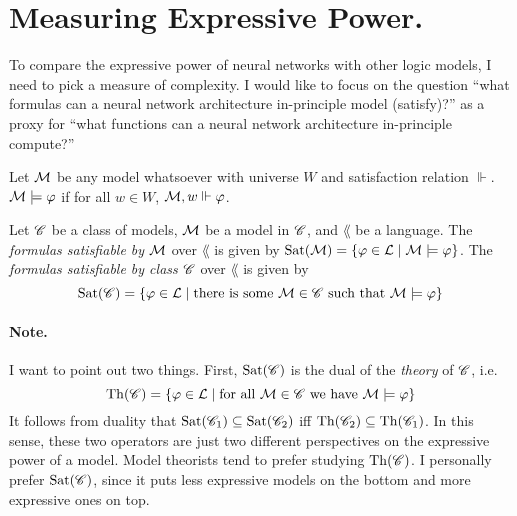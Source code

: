 \documentclass[letterpaper]{article}
\begin{document}




\section*{Measuring Expressive Power.} 

To compare the expressive power of neural networks with other logic models, I need to pick a measure of complexity.  I would like to focus on the question ``what formulas can a neural network architecture in-principle model (satisfy)?'' as a proxy for ``what functions can a neural network architecture in-principle compute?''

\begin{definition}
    Let $\mathcal{M}$ be any model whatsoever with universe $W$ and satisfaction relation $\Vdash$.  $\mathcal{M} \models \varphi$ if for all $w \in W$, $\mathcal{M}, w \Vdash \varphi$.
\end{definition}

\begin{definition}
    Let $\mathscr{C}$ be a class of models, $\mathcal{M}$ be a model in $\mathscr{C}$, and $\lang$ be a language.  The \emph{formulas satisfiable by} $\mathcal{M}$ over $\lang$ is given by $\mathrm{Sat}( \mathcal{M} ) = \{ \varphi \in \mathcal{L} \mid \mathcal{M} \models \varphi \}$.  The \emph{formulas satisfiable by class $\mathscr{C}$} over $\lang$ is given by 
    \[
        \mathrm{Sat}( \mathscr{C} ) = \{ \varphi \in \mathcal{L} \mid \textrm{there is some } \mathcal{M} \in \mathscr{C} \textrm{ such that } \mathcal{M} \models \varphi \}
    \]
\end{definition}

\paragraph*{Note.}  I want to point out two things.  First, $\mathrm{Sat}( \mathscr{C} )$ is the dual of the \emph{theory} of $\mathscr{C}$, i.e.
\[
    \mathrm{Th}( \mathscr{C} ) = \{ \varphi \in \mathcal{L} \mid \textrm{for all } \mathcal{M} \in \mathscr{C} \textrm{ we have } \mathcal{M} \models \varphi \}
\]
It follows from duality that $\mathrm{Sat}( \mathscr{C}_1 ) \subseteq \mathrm{Sat}( \mathscr{C}_2 )$ iff $\mathrm{Th}( \mathscr{C}_2 ) \subseteq \mathrm{Th}( \mathscr{C}_1 )$.  In this sense, these two operators are just two different perspectives on the expressive power of a model.  Model theorists tend to prefer studying $\mathrm{Th}( \mathscr{C} )$.  I personally prefer $\mathrm{Sat}( \mathscr{C} )$, since it puts less expressive models on the bottom and more expressive ones on top.
\end{document}
